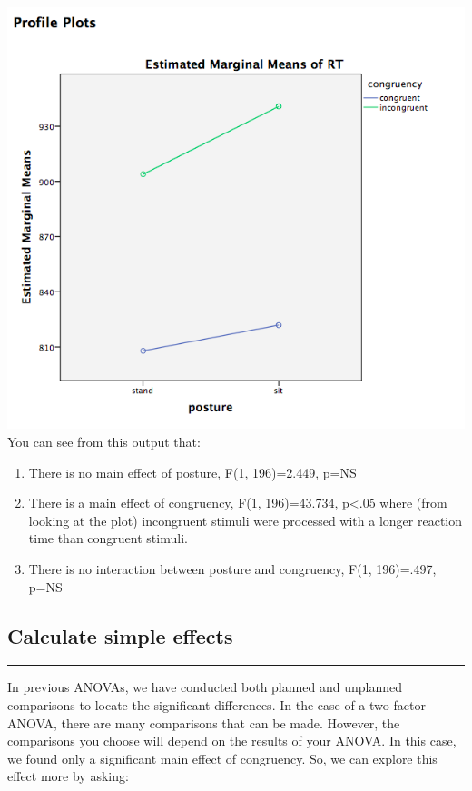 \documentclass[
]{book}
\providecommand{\tightlist}{%
  \setlength{\itemsep}{0pt}\setlength{\parskip}{0pt}}
\begin{document}
\includegraphics{img/10.4.17.png}
You can see from this output that:

\begin{enumerate}
\def\labelenumi{\arabic{enumi}.}
\tightlist
\item
  There is no main effect of posture, F(1, 196)=2.449, p=NS
\item
  There is a main effect of congruency, F(1, 196)=43.734, p\textless.05 where (from looking at the plot) incongruent stimuli were processed with a longer reaction time than congruent stimuli.
\item
  There is no interaction between posture and congruency, F(1, 196)=.497, p=NS
\end{enumerate}

\hypertarget{calculate-simple-effects}{%
\subsection{Calculate simple effects}\label{calculate-simple-effects}}

\begin{center}\rule{0.5\linewidth}{0.5pt}\end{center}

In previous ANOVAs, we have conducted both planned and unplanned comparisons to locate the significant differences. In the case of a two-factor ANOVA, there are many comparisons that can be made. However, the comparisons you choose will depend on the results of your ANOVA. In this case, we found only a significant main effect of congruency. So, we can explore this effect more by asking:
\end{document}

